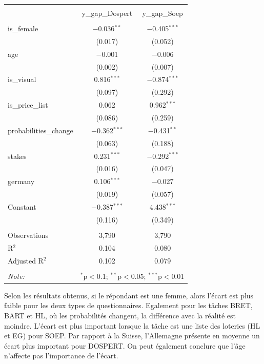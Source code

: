 \documentclass[12pt]{article}
\begin{document}
\begin{table}[!htbp] \centering 

  \label{} 
\small 
\begin{tabular}{@{\extracolsep{-5pt}}lcc} 
\\[-1.8ex]\\[-1.8ex] & y\_gap\_Dospert & y\_gap\_Soep \\ 
\hline \\[-1.8ex] 
 is\_female & $-$0.036$^{**}$ & $-$0.405$^{***}$ \\ 
  & (0.017) & (0.052) \\ 
  age & $-$0.001 & $-$0.006 \\ 
  & (0.002) & (0.007) \\ 
  is\_visual & 0.816$^{***}$ & $-$0.874$^{***}$ \\ 
  & (0.097) & (0.292) \\ 
  is\_price\_list & 0.062 & 0.962$^{***}$ \\ 
  & (0.086) & (0.259) \\ 
  probabilities\_change & $-$0.362$^{***}$ & $-$0.431$^{**}$ \\ 
  & (0.063) & (0.188) \\ 
  stakes & 0.231$^{***}$ & $-$0.292$^{***}$ \\ 
  & (0.016) & (0.047) \\ 
  germany & 0.106$^{***}$ & $-$0.027 \\ 
  & (0.019) & (0.057) \\ 
  Constant & $-$0.387$^{***}$ & 4.438$^{***}$ \\ 
  & (0.116) & (0.349) \\ 
 \hline \\[-1.8ex] 
Observations & 3,790 & 3,790 \\ 
R$^{2}$ & 0.104 & 0.080 \\ 
Adjusted R$^{2}$ & 0.102 & 0.079 \\ 
\hline \\[-1.8ex] 
\textit{Note:}  & \multicolumn{2}{r}{$^{*}$p$<$0.1; $^{**}$p$<$0.05; $^{***}$p$<$0.01} \\ 
\end{tabular} 
\end{table}

Selon les résultats obtenus, si le répondant est une femme, alors
l'écart est plus faible pour les deux types de questionnaires. Egalement
pour les tâches BRET, BART et HL, où les probabilités changent, la
différence avec la réalité est moindre. L'écart est plus important
lorsque la tâche est une liste des loteries (HL et EG) pour SOEP. Par
rapport à la Suisse, l'Allemagne présente en moyenne un écart plus
important pour DOSPERT. On peut également conclure que l'âge n'affecte
pas l'importance de l'écart.
\end{document}
